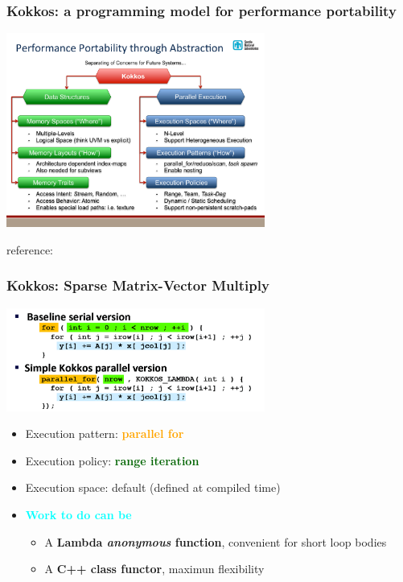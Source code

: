 \begin{frame}
  \frametitle{Kokkos: a programming model for performance portability}

  \begin{center}
    \includegraphics[width=8.5cm]{images/Kokkos-Multi-CoE_slide3}
  \end{center}

  {\small reference: }

\end{frame}

\begin{frame}
  \frametitle{Kokkos: Sparse Matrix-Vector Multiply}

  \begin{center}
    \includegraphics[width=8.5cm]{doc/perf_portability/kokkos_spmv}
  \end{center}

  \begin{itemize}
  \item Execution pattern: \textcolor{orange}{\textbf{parallel for}}
  \item Execution policy: \textcolor{darkgreen}{\textbf{range iteration}}
  \item Execution space: default (defined at compiled time)
  \item \textcolor{cyan}{\textbf{Work to do can be}}
    \begin{itemize}
    \item A \textbf{Lambda \textit{anonymous} function}, convenient for short loop bodies
    \item A \textbf{C++ class functor}, maximun flexibility
    \end{itemize}
  \end{itemize}
\end{frame}


